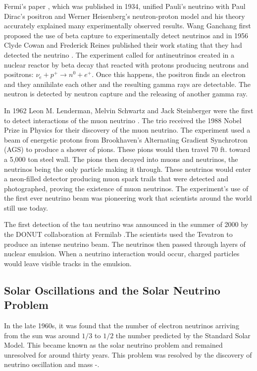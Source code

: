Fermi's paper \cite{fermi}, which was published in 1934, unified Pauli's neutrino with Paul Dirac's positron and Werner Heisenberg's neutron-proton model and his theory accurately explained many experimentally observed results. Wang Ganchang first proposed the use of beta capture to experimentally detect neutrinos and in 1956 Clyde Cowan and Frederick Reines published their work stating that they had detected the neutrino \cite{cowan1}\cite{cowan2}. The experiment called for antineutrinos created in a nuclear reactor by beta decay that reacted with protons producing neutrons and positrons: $\nu_{e} +p^{+}\rightarrow n^{0} + e^{+}$. Once this happens, the positron finds an electron and they annihilate each other and the resulting gamma rays are detectable. The neutron is detected by neutron capture and the releasing of another gamma ray. 

In 1962 Leon M. Lenderman, Melvin Schwartz and Jack Steinberger were the first to detect interactions of the muon neutrino \cite{leonlederman}. The trio received the 1988 Nobel Prize in Physics for their discovery of the muon neutrino. The experiment used a beam of energetic protons from Brookhaven's Alternating Gradient Synchrotron (AGS) to produce a shower of pions. These pions would then travel 70 ft. toward a 5,000 ton steel wall. The pions then decayed into muons and neutrinos, the neutrinos being the only particle making it through. These neutrinos would enter a neon-filled detector producing muon spark trails that were detected and photographed, proving the existence of muon neutrinos. The experiment's use of the first ever neutrino beam was pioneering work that scientists around the world still use today.  

The first detection of the tau neutrino was announced in the summer of 2000 by the DONUT collaboration at Fermilab \cite{donut}.The scientists used the Tevatron to produce an intense neutrino beam. The neutrinos then passed through layers of nuclear emulsion. When a neutrino interaction would occur, charged particles would leave visible tracks in the emulsion. 

\subsection{Solar Oscillations and the Solar Neutrino Problem}

In the late 1960s, it was found that the number of electron neutrinos arriving from the sun was around $1/3$ to $1/2$ the number predicted by the Standard Solar Model. This became known as the solar neutrino problem \cite{bahcall1} and remained unresolved for around thirty years. This problem was resolved by the discovery of neutrino oscillation and mass \cite{neutrinooscillation1}-\cite{neutrinooscillation4}.

